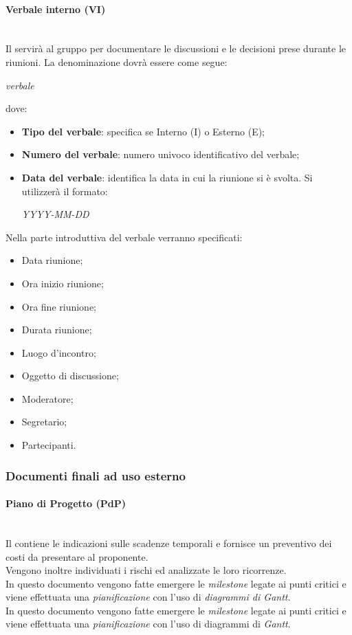 		\paragraph{Verbale interno (VI)}
		~\\Il \VI{} servirà al gruppo per documentare le discussioni e le decisioni prese durante le riunioni. 
		La denominazione dovrà essere come segue:\\
		\begin{center}
			\textit{verbale} 
		\end{center}
		dove:
		\begin{itemize}
			\item \textbf{Tipo del verbale}:
			specifica se Interno (I) o Esterno (E);
			\item \textbf{Numero del verbale}:
			numero univoco identificativo del verbale;
			\item \textbf{Data del verbale}:
			identifica la data in cui la riunione si è svolta. Si utilizzerà il formato:
			\begin{center}
				\emph{YYYY-MM-DD}
			\end{center}
		\end{itemize}
		Nella parte introduttiva del verbale verranno specificati:
		\begin{itemize}
			\item Data riunione;
			\item Ora inizio riunione;
			\item Ora fine riunione;
			\item Durata riunione;
			\item Luogo d'incontro;
			\item Oggetto di discussione;
			\item Moderatore;
			\item Segretario;
			\item Partecipanti.
		\end{itemize}

	\subsubsection{Documenti finali ad uso esterno}
	\paragraph{Piano di Progetto (PdP)}
	~\\Il \PdP{} contiene le indicazioni sulle scadenze temporali e fornisce un preventivo dei costi da presentare al proponente. 
	~\\Vengono inoltre individuati i rischi ed analizzate le loro ricorrenze.
	~\\In questo documento vengono fatte emergere le \emph{milestone} legate ai punti critici e viene effettuata una \emph{pianificazione} con l'uso di \emph{diagrammi di Gantt}.
	~\\In questo documento vengono fatte emergere le \emph{milestone} legate ai punti critici e viene effettuata una \emph{pianificazione} con l'uso di diagrammi di \emph{Gantt}.
